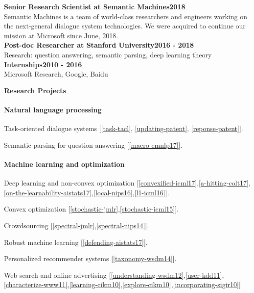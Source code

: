 \documentclass{res}
\newenvironment{my_item}{
\begin{itemize}
  \setlength{\itemsep}{0pt}
  \setlength{\parskip}{0pt}
  \setlength{\parsep}{0pt}}
{\end{itemize}
}
\begin{document}
\begin{resume}
\begin{my_item}
\end{my_item}
\vspace{-5pt}
{\bf Senior Research Scientist at Semantic Machines}\hfill\textbf{2018}\\
Semantic Machines is a team of world-class researchers and engineers working on the next-general dialogue system  technologies. We were acquired to continue our mission at Microsoft since June, 2018.\vspace{3pt}\\
{\bf Post-doc Researcher at Stanford University}\hfill\textbf{2016 - 2018}\\
{Research: question answering, semantic parsing, deep learning theory}\vspace{3pt}\\
{\bf Internships}\hfill\textbf{2010 - 2016}\\
Microsoft Research, Google, Baidu

{\bf\Large Research Projects}

\vspace{-10pt}
\paragraph{Natural language processing}
\begin{my_item}
\item Task-oriented dialogue systems [\ref{task-tacl}, \ref{updating-patent}, \ref{reponse-patent}].
\item Semantic parsing for question answering [\ref{macro-emnlp17}].
\end{my_item}

\vspace{-10pt}
\paragraph{Machine learning and optimization}
\begin{my_item}
\item Deep learning and non-convex optimization [\ref{convexified-icml17},\ref{a-hitting-colt17},\ref{on-the-learnability-aistats17},\ref{local-nips16},\ref{l1-icml16}].
\item Convex optimization [\ref{stochastic-jmlr},\ref{stochastic-icml15}].
\item Crowdsourcing [\ref{spectral-jmlr},\ref{spectral-nips14}].
\item Robust machine learning [\ref{defending-aistats17}].
\item Personalized recommender systems [\ref{taxonomy-wsdm14}].
\item Web search and online advertising [\ref{understanding-wsdm12},\ref{user-kdd11},\ref{characterize-www11},\ref{learning-cikm10},\ref{explore-cikm10},\ref{incorporating-sigir10}]
\end{my_item}


\end{resume}
\end{document}
